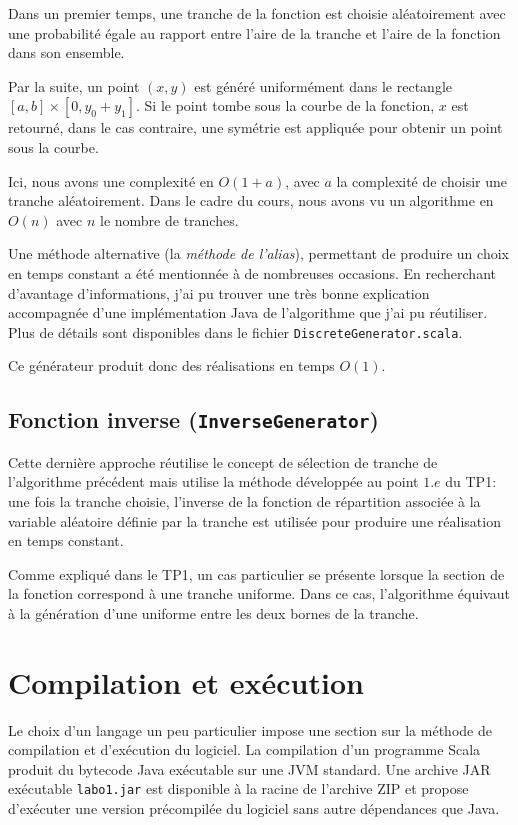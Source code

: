 \documentclass[a4paper,11pt]{article}
\begin{document}
Dans un premier temps, une tranche de la fonction est choisie aléatoirement avec une probabilité égale au rapport entre l'aire de la tranche et l'aire de la fonction dans son ensemble.

Par la suite, un point $(x, y)$ est généré uniformément dans le rectangle $[a, b]\times[0,y_0+y_1]$. Si le point tombe sous la courbe de la fonction, $x$ est retourné, dans le cas contraire, une symétrie est appliquée pour obtenir un point sous la courbe. 

Ici, nous avons une complexité en $O(1 + a)$, avec $a$ la complexité de choisir une tranche aléatoirement. Dans le cadre du cours, nous avons vu un algorithme en $O(n)$ avec $n$ le nombre de tranches.

Une méthode alternative (la \emph{méthode de l'alias}), permettant de produire un choix en temps constant a été mentionnée à de nombreuses occasions. En recherchant d'avantage d'informations, j'ai pu trouver une très bonne explication accompagnée d'une implémentation Java de l'algorithme que j'ai pu réutiliser. Plus de détails sont disponibles dans le fichier \texttt{DiscreteGenerator.scala}.

Ce générateur produit donc des réalisations en temps $O(1)$.

\subsection{Fonction inverse {\normalfont({\tt InverseGenerator})}}

Cette dernière approche réutilise le concept de sélection de tranche de l'algorithme précédent mais utilise la méthode développée au point $1.e$ du TP1: une fois la tranche choisie, l'inverse de la fonction de répartition associée à la variable aléatoire définie par la tranche est utilisée pour produire une réalisation en temps constant.

Comme expliqué dans le TP1, un cas particulier se présente lorsque la section de la fonction correspond à une tranche uniforme. Dans ce cas, l'algorithme équivaut à la génération d'une uniforme entre les deux bornes de la tranche. 

\section{Compilation et exécution}

Le choix d'un langage un peu particulier impose une section sur la méthode de compilation et d'exécution du logiciel. La compilation d'un programme Scala produit du bytecode Java exécutable sur une JVM standard. Une archive JAR exécutable \texttt{labo1.jar} est disponible à la racine de l'archive ZIP et propose d'exécuter une version précompilée du logiciel sans autre dépendances que Java.
\end{document}
